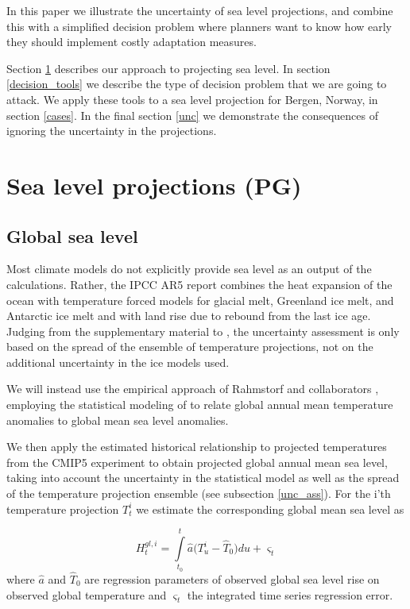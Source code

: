 \documentclass[draft,linenumbers]{agujournal}
\begin{document}
In this paper we illustrate the uncertainty of sea level projections, and combine this with a simplified decision problem where planners want to know how early they should implement costly adaptation measures.

Section \ref{sealevelproj} describes our approach to projecting sea level. In section \ref{decision_tools} we describe the type of decision problem that we are going to attack. We apply these tools to a sea level projection for Bergen, Norway, %
in section \ref{cases}.  In the final section \ref{unc}  we demonstrate the consequences of ignoring the uncertainty in the projections.

\section{Sea level projections {\color{blue} (PG)}}

\label{sealevelproj}

\subsection{Global sea level}
Most climate models do not explicitly provide sea level as an output of the calculations. Rather, the IPCC AR5 report \citep[ch.~13]{ipcc} combines the heat expansion of the ocean with temperature forced models for glacial melt, Greenland ice melt, and Antarctic ice melt and with land rise due to rebound from the last ice age. Judging from the supplementary material to \citet[ch.~13]{ipcc}, the uncertainty assessment is only based on the spread of the ensemble of temperature projections, not on the additional uncertainty in the ice models used.

We will instead use the empirical approach of Rahmstorf and collaborators \citep{Rahmstorf07,Rahmstorf11}, employing the statistical modeling of \citet{Bolin2014a} to relate global annual mean temperature anomalies to global mean sea level anomalies. 


We then apply the estimated historical relationship to projected temperatures from the CMIP5 experiment \citep{cmip5} to obtain projected global annual mean sea level, taking into account the uncertainty in the statistical model as well as the spread of the temperature projection ensemble (see subsection \ref{unc_ass}). 
For the i'th temperature projection $T_t^i$ we estimate the corresponding global mean sea level as

\[H_t^{gl,i} = \int\limits_{{t_0}}^t {{\hat a} (T_u^i - {{\hat T}_0}} )du + {\varsigma _t}\]
where ${\hat a}$ and ${\hat T}_0$ are regression parameters of observed global sea level  rise on observed global temperature and $\varsigma_t$ the integrated time series regression error.
\end{document}

